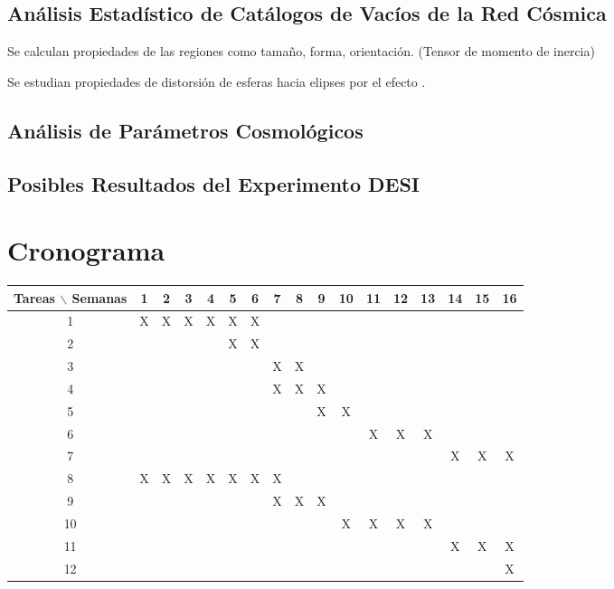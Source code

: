 \documentclass[preprint]{aastex62}
\begin{document}
  \subsection{Análisis Estadístico de Catálogos de Vacíos de la Red Cósmica}

  Se calculan propiedades de las regiones como tamaño, forma, orientación. (Tensor de momento de inercia) \citep{El-Ad1997}

  Se estudian propiedades de distorsión de esferas hacia elipses por el efecto \citet{AlcockPaczynski1979}.
  \subsection{Análisis de Parámetros Cosmológicos}

  \subsection{Posibles Resultados del Experimento DESI}
  


  

  \section{Cronograma}

  \begin{table}[htb]
    \begin{tabular}{|c|cccccccccccccccc| }
      \hline
      Tareas $\backslash$ Semanas & 1 & 2 & 3 & 4 & 5 & 6 & 7 & 8 & 9 & 10 & 11 & 12 & 13 & 14 & 15 & 16  \\
      \hline
      1 & X & X & X & X & X & X &   &   &   &   &   &   &   &   &   &   \\
      2 &   &   &   &   & X & X &   &   &   &   &   &   &   &   &   &   \\
      3 &   &   &   &   &   &   & X & X &   &   &   &   &   &   &   &   \\
      4 &   &   &   &   &   &   & X & X & X &   &   &   &   &   &   &   \\
      5 &   &   &   &   &   &   &   &   & X & X &   &   &   &   &   &   \\
      6 &   &   &   &   &   &   &   &   &   &   & X & X & X &   &   &   \\
      7 &   &   &   &   &   &   &   &   &   &   &   &   &   & X & X & X \\
      8 & X & X & X & X & X & X & X &   &   &   &   &   &   &   &   &   \\
      9 &   &   &   &   &   &   & X & X & X &   &   &   &   &   &   &   \\
      10&   &   &   &   &   &   &   &   &   & X & X & X & X &   &   &   \\
      11&   &   &   &   &   &   &   &   &   &   &   &   &   & X & X & X \\
      12&   &   &   &   &   &   &   &   &   &   &   &   &   &   &   & X \\
      \hline
    \end{tabular}
  \end{table}
\end{document}
